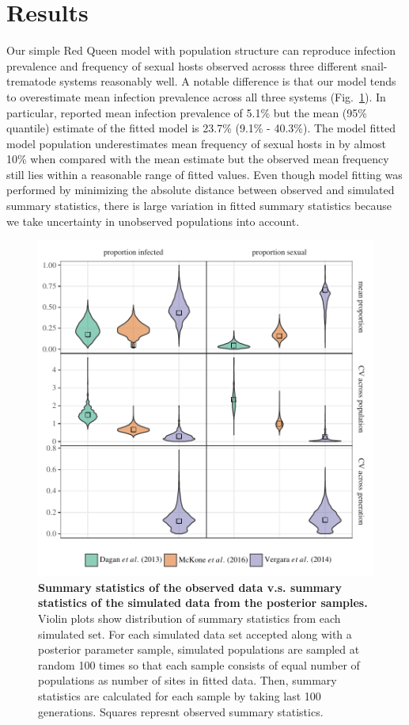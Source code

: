 \documentclass{article}\usepackage[]{graphicx}\usepackage[]{color}
\newcommand{\fref}[1]{Fig.~\ref{fig:#1}}
\begin{document}
\section{Results}

Our simple Red Queen model with population structure can reproduce infection prevalence and frequency of sexual hosts observed acrosss three different snail-trematode systems reasonably well.
A notable difference is that our model tends to overestimate mean infection prevalence across all three systems (\fref{smcsumm}).
In particular, \cite{mckone2016fine} reported mean infection prevalence of 5.1\% but the mean (95\% quantile) estimate of the fitted model is 23.7\% (9.1\% - 40.3\%).
The model fitted model \cite{vergara2014infection} population underestimates mean frequency of sexual hosts in by almost 10\% when compared with the mean estimate but the observed mean frequency still lies within a reasonable range of fitted values.
Even though model fitting was performed by minimizing the absolute distance between observed and simulated summary statistics, there is large variation in fitted summary statistics because we take uncertainty in unobserved populations into account.

\begin{figure}[!htp]
\includegraphics[width=\textwidth]{../fig/smc_summary.pdf}
\caption{{\bf Summary statistics of the observed data v.s. summary statistics of the simulated data from the posterior samples.}
Violin plots show distribution of summary statistics from each simulated set. For each simulated data set accepted along with a posterior parameter sample, simulated populations are sampled at random 100 times so that each sample consists of equal number of populations as number of sites in fitted data. Then, summary statistics are calculated for each sample by taking last 100 generations. Squares represnt observed summary statistics.
}
\label{fig:smcsumm}
\end{figure}
\end{document}
